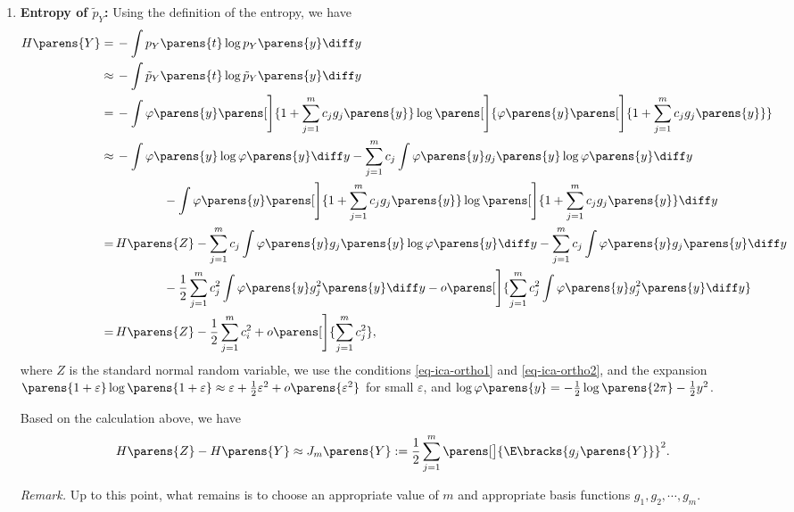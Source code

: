 \documentclass[12pt]{article}
\begin{document}
\begin{enumerate}[label=\textbf{\arabic*.}]
	\item \textbf{Entropy of $\tilde{p}_Y$:} Using the definition of the entropy, we have 
	\begin{align*}
		H \parens{Y} = & \, - \int p_Y \parens{t} \log p_Y \parens{y} \diff y \\ 
		\approx & \, - \int \tilde{p}_Y \parens{t} \log \tilde{p}_Y \parens{y} \diff y \\ 
		= & \, - \int \varphi \parens{y} \parens[\Bigg]{1 + \sum_{j=1}^m c_j g_j \parens{y}} \log \parens[\Bigg]{\varphi \parens{y} \parens[\Bigg]{1 + \sum_{j=1}^m c_j g_j \parens{y}}} \\ 
		\approx & \, - \int \varphi \parens{y} \log \varphi \parens{y} \diff y - \sum_{j=1}^m c_j \int \varphi \parens{y} g_j \parens{y} \log \varphi \parens{y} \diff y \\ 
		& \qquad \qquad - \int \varphi \parens{y} \parens[\Bigg]{1 + \sum_{j=1}^m c_j g_j \parens{y}} \log \parens[\Bigg]{1 + \sum_{j=1}^m c_j g_j \parens{y}} \diff y \\ 
		= & \, H \parens{Z} - \sum_{j=1}^m c_j \int \varphi \parens{y} g_j \parens{y} \log \varphi \parens{y} \diff y - \sum_{j=1}^m c_j \int \varphi \parens{y} g_j \parens{y} \diff y \\ 
		& \qquad \qquad - \frac{1}{2} \sum_{j=1}^m c_j^2 \int \varphi \parens{y} g_j^2 \parens{y} \diff y - o \parens[\Bigg]{\sum_{j=1}^m c_j^2 \int \varphi \parens{y} g_j^2 \parens{y} \diff y}  \\ 
		= & \, H \parens{Z} - \frac{1}{2} \sum_{j=1}^m c_i^2 + o \parens[\Bigg]{\sum_{j=1}^m c_j^2}, 
	\end{align*}
	where $Z$ is the standard normal random variable, we use the conditions \eqref{eq-ica-ortho1} and \eqref{eq-ica-ortho2}, and the expansion $\parens{1 + \varepsilon} \log \parens{1 + \varepsilon} \approx \varepsilon + \frac{1}{2} \varepsilon^2 + o \parens{\varepsilon^2}$ for small $\varepsilon$, and $\log \varphi \parens{y} = - \frac{1}{2} \log \parens{2 \pi} - \frac{1}{2} y^2$. 
	
	Based on the calculation above, we have 
	\begin{align*}
		H \parens{Z} - H \parens{Y} \approx J_m \parens{Y} := \frac{1}{2} \sum_{j=1}^m \parens[\big]{\E \bracks{g_j \parens{Y}}}^2. 
	\end{align*}
	
	\textit{Remark.} Up to this point, what remains is to choose an appropriate value of $m$ and appropriate basis functions $g_1, g_2, \cdots, g_m$. 
	

\end{enumerate}
\end{document}
